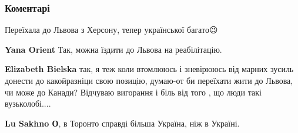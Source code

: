  
 
 
 
 
\subsubsection{Коментарі}
\label{sec:15_07_2021.fb.bielskaja_elizaveta.1.peredoz_rosijskoju.cmt}

\begin{itemize}
 
Переїхала до Львова з Херсону, тепер української багато😉

\begin{itemize}
 
\textbf{Yana Orient} Так, можна їздити до Львова на реабілітацію. \Smiley[1.0][yellow]

 
\textbf{Elizabeth Bielska} так, я теж коли втомлююсь і зневірююсь від марних
зусиль донести до какойразніци свою позицію, думаю-от би переїхати жити до
Львова, чи може до Канади? Відчуваю вигорання і біль від того , що люди такі
вузьколобі....

 
\textbf{Lu Sakhno О}, в Торонто справді більша Україна, ніж в Україні.


\end{itemize}
\end{itemize}

